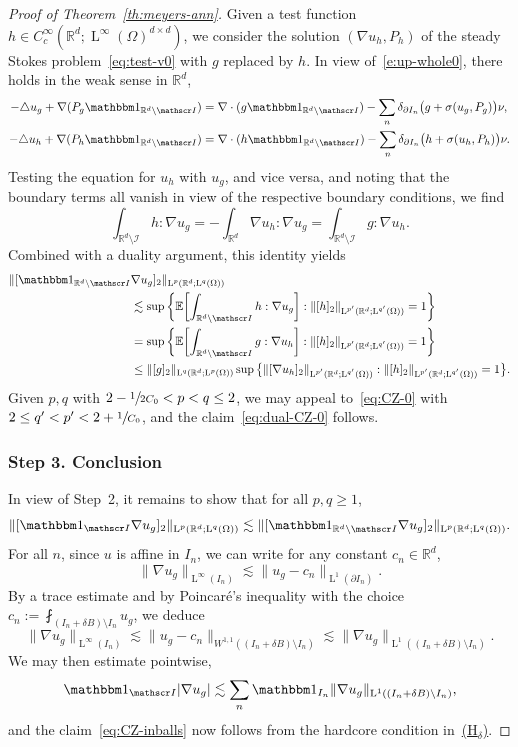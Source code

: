 \documentclass[10pt]{amsart}
\let\mathcal\mathscr
\newcommand{\Hd}{\hyperref[Hd]{\textup{(H$_\delta$)}}\xspace}
\let\mathds\mathbbm
\theoremstyle{plain}
\theoremstyle{definition}
\newcommand{\R}{\mathbb R}
\newcommand{\Ic}{\mathcal I}
\newcommand{\Ld}{\operatorname{L}}
\newcommand{\step}[1]{\subsubsection*{Step #1}}
\newcommand{\E}{\mathbb{E}}
\begin{document}
\begin{proof}[Proof of Theorem~\ref{th:meyers-ann}]
Given a test function $h\in C^\infty_c(\R^d;\Ld^\infty(\Omega)^{d\times d})$, we consider the solution $(\nabla u_h,P_h)$ of the steady Stokes problem~\eqref{eq:test-v0} with $g$ replaced by $h$.
In view of~\eqref{e:up-whole0}, there holds in the weak sense in $\R^d$,
\begin{align*}
-\triangle u_g+\nabla(P_g\mathds1_{\R^d\setminus\Ic})&=\nabla\cdot (g\mathds1_{\R^d\setminus\Ic})-\sum_n\delta_{\partial I_{n}}\big(g+\sigma(u_g,P_g)\big)\nu,\\
-\triangle u_h+\nabla(P_h\mathds1_{\R^d\setminus\Ic})&=\nabla\cdot (h\mathds1_{\R^d\setminus\Ic})-\sum_n\delta_{\partial I_{n}}\big(h+\sigma(u_h,P_h)\big)\nu.
\end{align*}
Testing the equation for $u_h$ with $u_g$, and vice versa, and noting that the boundary terms all vanish in view of the respective boundary conditions, we find
\begin{equation*}
\int_{\R^d\setminus\Ic}h:\nabla u_g=-\int_{\R^d}\nabla u_h:\nabla u_g=\int_{\R^d\setminus\Ic}g:\nabla u_h.
\end{equation*}
Combined with a duality argument, this identity yields
\begin{align*}
\|[\mathds1_{\R^d\setminus\Ic}&\nabla u_g]_2\|_{\Ld^{p}(\R^d;\Ld^{q}(\Omega))}\\
&\lesssim\sup\bigg\{\E\bigg[{\int_{\R^d\setminus\Ic}h:\nabla u_g}\bigg] : \|[h]_2\|_{\Ld^{p'}(\R^d;\Ld^{q'}(\Omega))}=1\bigg\}\\
&=\sup\bigg\{\E\bigg[{\int_{\R^d\setminus\Ic}g:\nabla u_h}\bigg] : \|[h]_2\|_{\Ld^{p'}(\R^d;\Ld^{q'}(\Omega))}=1\bigg\}\\
&\le\|[g]_2\|_{\Ld^{q}(\R^d;\Ld^{p}(\Omega))}\sup\big\{\|[\nabla u_h]_2\|_{\Ld^{p'}(\R^d;\Ld^{q'}(\Omega))} : \|[h]_2\|_{\Ld^{p'}(\R^d;\Ld^{q'}(\Omega))}=1\big\}.
\end{align*}
Given $p,q$ with $2-\sfrac1{2C_0}<p<q\le2$, we may appeal to~\eqref{eq:CZ-0} with $2\le q'<p'<2+\sfrac1{C_0}$, and the claim~\eqref{eq:dual-CZ-0} follows.

\step{3. Conclusion}
In view of Step~2, it remains to show that for all $p,q\ge1$,
\begin{equation}\label{eq:CZ-inballs}
\|[\mathds1_{\Ic}\nabla u_g]_2\|_{\Ld^p(\R^d;\Ld^q(\Omega))}\lesssim \|[\mathds1_{\R^d\setminus\Ic}\nabla u_g]_2\|_{\Ld^p(\R^d;\Ld^q(\Omega))}.
\end{equation}
For all $n$, since $u$ is affine in $I_{n}$, we can write for any constant $c_{n}\in\R^d$,
\[\|\nabla u_g\|_{\Ld^\infty(I_{n})}\lesssim \|u_g-c_{n}\|_{\Ld^1(\partial I_{n})}.\]
By a trace estimate and by Poincaré's inequality with the choice $c_{n}:=\fint_{(I_{n}+\delta B)\setminus I_{n}}u_g$, we deduce
\[\|\nabla u_g\|_{\Ld^\infty(I_{n})}\lesssim \|u_g-c_{n}\|_{W^{1,1}((I_{n}+\delta B)\setminus I_{n})}\lesssim \|\nabla u_g\|_{\Ld^1((I_{n}+\delta B)\setminus I_{n})}.\]
We may then estimate pointwise,
\[\mathds1_{\Ic}|\nabla u_g|\lesssim \sum_n\mathds1_{I_{n}}\|\nabla u_g\|_{\Ld^1((I_{n}+\delta B)\setminus I_{n})},\]
and the claim~\eqref{eq:CZ-inballs} now follows from the hardcore condition in~\Hd.
\end{proof}
\end{document}
